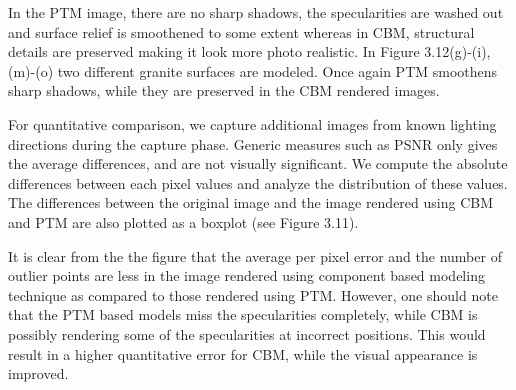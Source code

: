 In the PTM image, there are no sharp shadows, the specularities are washed out
and surface relief is smoothened to some extent whereas in CBM, structural
details are preserved making it look more photo realistic. In Figure 3.12(g)-(i),(m)-(o)
two different granite surfaces are modeled. Once again PTM smoothens sharp
shadows, while they are preserved in the CBM rendered images.

For quantitative comparison, we capture additional images from known lighting
directions during the capture phase. Generic measures such as PSNR only gives
the average differences, and are not visually significant. We compute the
absolute differences between each pixel values and analyze the distribution of
these values. The differences between the original image and the image rendered
using CBM and PTM are also plotted as a boxplot (see Figure 3.11).




It is clear from the the figure that the average per pixel error and the number
of outlier points are less in the image rendered using component based modeling
technique as compared to those rendered using PTM. However, one should note that
the PTM based models miss the specularities completely, while CBM is possibly
rendering some of the specularities at incorrect positions. This would result in
a higher quantitative error for CBM, while the visual appearance is improved.

